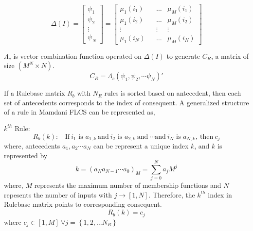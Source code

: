 \begin{equation} \label{eq:Ftran}
\Delta  \left( I \right) = \left[ {\begin{array}{*{20}{c}}
	{{\psi _1}}\\
	{{\psi _2}}\\
	\vdots \\
	{{\psi _N}}
	\end{array}} \right] = \left[ {\begin{array}{*{20}{c}}
	{{\mu _1}\left( {{i_1}} \right)}&{}& \ldots &{{\mu _M}\left( {{i_1}} \right)}\\
	{{\mu _1}\left( {{i_2}} \right)}&{}& \ldots &{{\mu _M}\left( {{i_2}} \right)}\\
	\vdots &{}& \vdots & \vdots \\
	{{\mu _1}\left( {{i_N}} \right)}&{}& \ldots &{{\mu _M}\left( {{i_N}} \right)}
	\end{array}} \right]
\end{equation}


$ \Lambda_c $ is vector combination function operated on $ \Delta  \left( I \right)  $ to generate $ {C_R} $, a matrix of size $ \left( {{M^N} \times N} \right) $.
\[{C_R} = {\Lambda_c}{\left( {{\psi _1},{\psi _2}, \cdots {\psi _N}} \right)'}\]

If a Rulebase matrix $ R_b $ with $ N_R $ rules is sorted based on antecedent, then each set of antecedents corresponds to the index of consequent. A generalized structure of a rule in Mamdani FLCS can be represented as,

$ k^{th} $ Rule:
\begin{equation} \label{eq:a_c}
{R_b}\left( k \right):~~~~\text{If}~i_1\text{ is }{a_{1,k}}~\text{and}~i_2\text{ is }{a_{2,k}}~\text{and}~\cdots \text{and}~i_N\text{ is }{a_{N,k}},~\text{then}~{c_j}
\end{equation}
where, antecedents $ {a_1},{a_2} \cdots {a_N} $ can be represent a unique index $ k $, and $ k $ is represented by 
\begin{equation} \label{eq:index}
k = {\left( {{a_N}{a_{N - 1}} \cdots {a_0}} \right)_M} = \sum\limits_{j = 0}^N {{a_j}{M^j}} 
\end{equation}
where, $ M $ represents the maximum number of membership functions and $ N $ repesents the number of inputs with  $ j \to [1,N]$.
Therefore, the $ k^{th} $ index in Rulebase matrix points to corresponding consequent.
\begin{equation}
{R_b}\left( k \right) = {c_j}
\end{equation}
where $ {c_j} \in \left[ {1,M} \right]~\forall j = \left\{ {1,2, \ldots {N_R}} \right\} $

